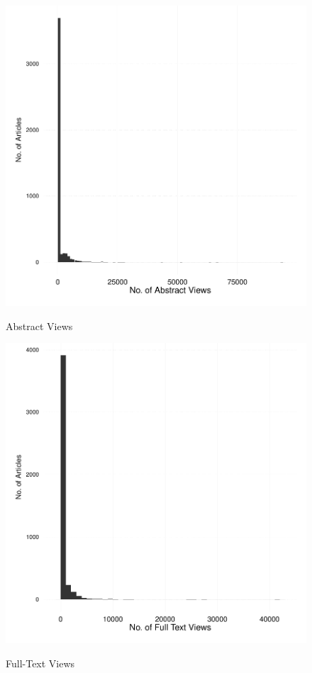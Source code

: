 \documentclass[12pt]{article}
\begin{document}
\begin{figure}[htbp]
\centering
\caption{Abstract Views}
\includegraphics[scale=.85]{../figs/abstract_views.pdf}
\label{fig:abstracts}
\end{figure}

\begin{figure}[htbp]
\centering
\caption{Full-Text Views}
\includegraphics[scale=.85]{../figs/fulltext_views.pdf}
\label{fig:fulltext}
\end{figure}
\end{document}
